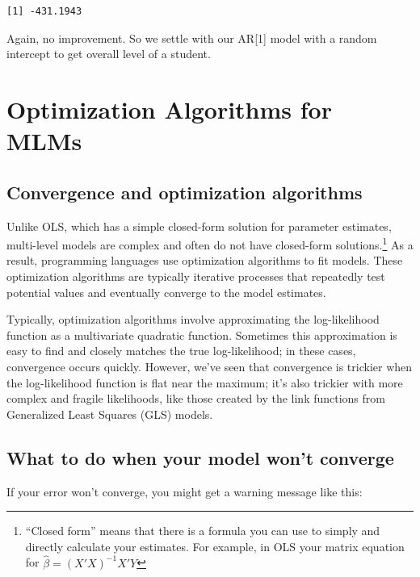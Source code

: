 \documentclass[
  letterpaper,
  DIV=11,
  numbers=noendperiod]{scrreprt}
\begin{document}
\begin{verbatim}
[1] -431.1943
\end{verbatim}

Again, no improvement. So we settle with our AR{[}1{]} model with a
random intercept to get overall level of a student.

\hypertarget{optimization-algorithms-for-mlms}{%
\chapter{Optimization Algorithms for
MLMs}\label{optimization-algorithms-for-mlms}}

\hypertarget{convergence-and-optimization-algorithms}{%
\section{Convergence and optimization
algorithms}\label{convergence-and-optimization-algorithms}}

Unlike OLS, which has a simple closed-form solution for parameter
estimates, multi-level models are complex and often do not have
closed-form solutions.\footnote{``Closed form'' means that there is a
  formula you can use to simply and directly calculate your estimates.
  For example, in OLS your matrix equation for
  \(\hat{\beta} = (X'X)^{-1}X'Y\)} As a result, programming languages
use optimization algorithms to fit models. These optimization algorithms
are typically iterative processes that repeatedly test potential values
and eventually converge to the model estimates.

Typically, optimization algorithms involve approximating the
log-likelihood function as a multivariate quadratic function. Sometimes
this approximation is easy to find and closely matches the true
log-likelihood; in these cases, convergence occurs quickly. However,
we've seen that convergence is trickier when the log-likelihood function
is flat near the maximum; it's also trickier with more complex and
fragile likelihoods, like those created by the link functions from
Generalized Least Squares (GLS) models.

\hypertarget{what-to-do-when-your-model-wont-converge}{%
\section{What to do when your model won't
converge}\label{what-to-do-when-your-model-wont-converge}}

If your error won't converge, you might get a warning message like this:
\end{document}
